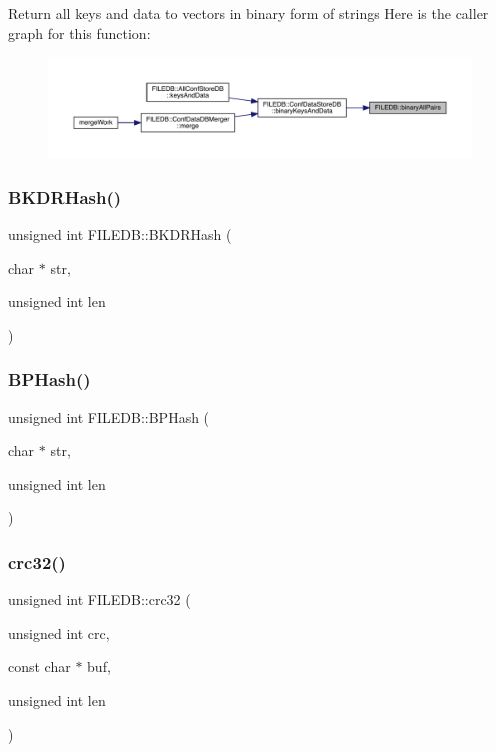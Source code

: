 Return all keys and data to vectors in binary form of strings Here is the caller graph for this function\+:\nopagebreak
\begin{figure}[H]
\begin{center}
\leavevmode
\includegraphics[width=350pt]{d2/de6/namespaceFILEDB_ac242fd8f47258576482a692de8d1eaf3_icgraph}
\end{center}
\end{figure}
\mbox{\label{namespaceFILEDB_a06c984d24be338a8cfa3fcd1296914aa}} 
\subsubsection{\texorpdfstring{BKDRHash()}{BKDRHash()}}
{\footnotesize\ttfamily unsigned int F\+I\+L\+E\+D\+B\+::\+B\+K\+D\+R\+Hash (\begin{DoxyParamCaption}\item[{char $\ast$}]{str,  }\item[{unsigned int}]{len }\end{DoxyParamCaption})}

\mbox{\label{namespaceFILEDB_a81bebe16f4e0ccc238b04621af6ada41}} 
\subsubsection{\texorpdfstring{BPHash()}{BPHash()}}
{\footnotesize\ttfamily unsigned int F\+I\+L\+E\+D\+B\+::\+B\+P\+Hash (\begin{DoxyParamCaption}\item[{char $\ast$}]{str,  }\item[{unsigned int}]{len }\end{DoxyParamCaption})}

\mbox{\label{namespaceFILEDB_aa12ea161a9698d1b53c1026b06f0b0a5}} 
\subsubsection{\texorpdfstring{crc32()}{crc32()}}
{\footnotesize\ttfamily unsigned int F\+I\+L\+E\+D\+B\+::crc32 (\begin{DoxyParamCaption}\item[{unsigned int}]{crc,  }\item[{const char $\ast$}]{buf,  }\item[{unsigned int}]{len }\end{DoxyParamCaption})}

